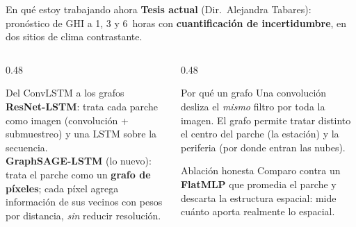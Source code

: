 \documentclass[10pt,aspectratio=169]{beamer}
\begin{document}
\begin{frame}{En qué estoy trabajando ahora}
  \textbf{Tesis actual} (Dir.\ Alejandra Tabares): pronóstico de GHI a 1, 3 y 6~horas
  con \textbf{cuantificación de incertidumbre}, en dos sitios de clima contrastante.

  \vspace{0.4em}
  \begin{columns}[T]
    \begin{column}{0.48\textwidth}
      \begin{block}{Del ConvLSTM a los grafos}
        \small
        \textbf{ResNet-LSTM}: trata cada parche como imagen (convolución +
        submuestreo) y una LSTM sobre la secuencia.\\[0.35em]
        \textbf{GraphSAGE-LSTM} (lo nuevo): trata el parche como un
        \textbf{grafo de píxeles}; cada píxel agrega información de sus vecinos
        con pesos por distancia, \emph{sin} reducir resolución.
      \end{block}
    \end{column}
    \begin{column}{0.48\textwidth}
      \begin{block}{Por qué un grafo}
        \small
        Una convolución desliza el \emph{mismo} filtro por toda la imagen. El
        grafo permite tratar distinto el centro del parche (la estación) y la
        periferia (por donde entran las nubes).
      \end{block}
      \begin{alertblock}{Ablación honesta}
        \small
        Comparo contra un \textbf{FlatMLP} que promedia el parche y descarta la
        estructura espacial: mide cuánto aporta realmente lo espacial.
      \end{alertblock}
    \end{column}
  \end{columns}
\end{frame}
\end{document}
